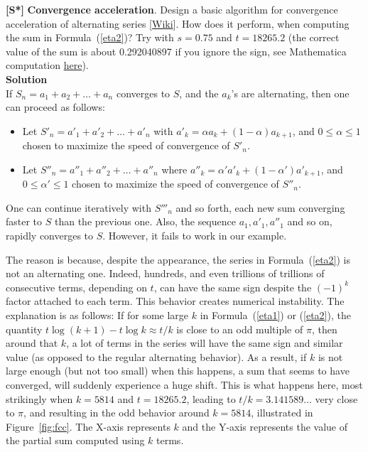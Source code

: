 \documentclass[10pt]{article}
\begin{document}
\begin{Exercise}\label{exercise12}{\bf [S*]} 
{\bf Convergence acceleration}.
Design a basic algorithm for \textcolor{index}{convergence acceleration} of 
alternating series [\href{https://en.wikipedia.org/wiki/Alternating_series}{Wiki}]. 
How does it perform, when computing the sum in
Formula~(\ref{eta2})? Try with $s=0.75$ and $t=18265.2$ (the correct value of the sum is about 0.292040897 if you ignore the sign, see Mathematica computation \href{https://bit.ly/32uIwpE}{here}). \vspace{1ex}   \\
{\bf Solution} \vspace{1ex}   \\
If $S_n=a_1+a_2+\dots+a_n$ converges to $S$, and the $a_k$'s are alternating, then one can proceed as follows:

\begin{itemize}
\item Let $S'_n=a'_1+a'_2+\dots +a'_n$ with $a'_k= \alpha a_k + (1-\alpha)a_{k+1}$, and $0\leq \alpha\leq 1$ chosen to maximize the speed of convergence of $S'_n$.  
\item Let $S''_n=a''_1+a''_2 +\dots  +a''_n$ where $a''_k= \alpha' a'_k + (1-\alpha')a'_{k+1}$, and $0\leq \alpha' \leq1$ chosen to maximize the speed of convergence of $S''_n$.  
\end{itemize}
One can continue iteratively with $S'''_n$ and so forth, each new sum converging faster to $S$ than the previous one. Also, the sequence $a_1,a'_1,a''_1$ and so on, rapidly converges to $S$.  However, it fails to work in our example.

The reason is because, despite the appearance, the series in Formula~(\ref{eta2}) is not an alternating one. Indeed, hundreds, and even trillions of trillions of consecutive terms, depending on $t$, can have the same sign despite the $(-1)^k$ factor attached to each term. This behavior creates  \textcolor{index}{numerical instability}. The explanation is as follows: If for some large $k$ in Formula~(\ref{eta1}) or (\ref{eta2}),  the quantity $t \log(k+1)-t \log k \approx t/k$ 
is close to an odd multiple of $\pi$, then around that $k$, a lot of terms in the series will have the same sign and similar value (as opposed to the regular alternating behavior). As a result, if $k$ is not large enough (but not too small) when this happens, a sum that seems to have converged, will suddenly experience a huge shift. This is what happens here, most strikingly when $k=5814$ and $t=18265.2$, leading to $t/k =3.141589\dots$ very close to $\pi$, and resulting in the odd behavior around $k=5814$, illustrated in Figure~\ref{fig:fcc}. The X-axis represents $k$ and the Y-axis represents the value of the partial sum computed using $k$ terms.



\end{Exercise}
\end{document}
